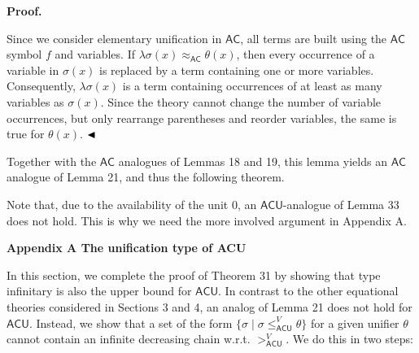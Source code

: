 \documentclass[10pt,a4paper]{amsart}
\begin{document}
 
 
 
 
\par\medskip\noindent\textbf{Proof.}\par
 
 
Since we consider elementary unification in $\mathsf{AC}$, all terms are built using the $\mathsf{AC}$ symbol $f$ and variables. If $\lambda\sigma(x)\approx_{\mathsf{AC}}\theta(x)$, then every occurrence of a variable in $\sigma(x)$ is replaced by a term containing one or more variables. Consequently, $\lambda\sigma(x)$ is a term containing occurrences of at least as many variables as $\sigma(x)$. Since the theory cannot change the number of variable occurrences, but only rearrange parentheses and reorder variables, the same is true for $\theta(x)$. $\hfill\blacktriangleleft$\par
 
 
 
Together with the $\mathsf{AC}$ analogues of Lemmas 18 and 19, this lemma yields an $\mathsf{AC}$ analogue of Lemma 21, and thus the following theorem.\par
 

 
Note that, due to the availability of the unit $0$, an $\mathsf{ACU}$-analogue of Lemma 33 does not hold. This is why we need the more involved argument in Appendix A.\par
 
 
 


 
\par\medskip\noindent\textbf{Appendix A The unification type of ACU}\par
 
 
In this section, we complete the proof of Theorem 31 by showing that type infinitary is also the upper bound for $\mathsf{ACU}$. In contrast to the other equational theories considered in Sections 3 and 4, an analog of Lemma 21 does not hold for $\mathsf{ACU}$. Instead, we show that a set of the form $\{\sigma\mid\sigma\leq_{\mathsf{ACU}}^{V}\theta\}$ for a given unifier $\theta$ cannot contain an infinite decreasing chain w.r.t. $>_{\mathsf{ACU}}^{V}$. We do this in two steps:\par
  
\end{document}

